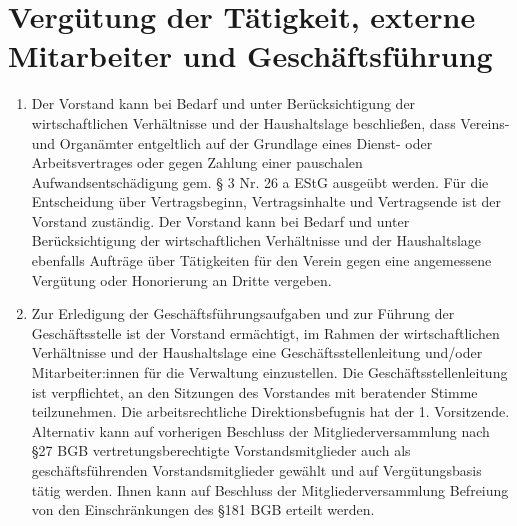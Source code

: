 \documentclass[12pt]{article}
\begin{document}
\section{Vergütung der Tätigkeit, externe Mitarbeiter und Geschäftsführung}
\begin{enumerate}[label=(\arabic*)]
	\item Der Vorstand kann bei Bedarf und unter Berücksichtigung der wirtschaftlichen Verhältnisse und
	      der Haushaltslage beschließen, dass Vereins- und Organämter entgeltlich auf der Grundlage eines
	      Dienst- oder Arbeitsvertrages oder gegen Zahlung einer pauschalen Aufwandsentschädigung gem. §
	      3 Nr. 26 a EStG ausgeübt werden. Für die Entscheidung über Vertragsbeginn, Vertragsinhalte und
	      Vertragsende ist der Vorstand zuständig.
	      Der Vorstand kann bei Bedarf und unter Berücksichtigung der wirtschaftlichen Verhältnisse und der
	      Haushaltslage ebenfalls Aufträge über Tätigkeiten für den Verein gegen eine angemessene
	      Vergütung oder Honorierung an Dritte vergeben.
	\item Zur Erledigung der Geschäftsführungsaufgaben und zur Führung der Geschäftsstelle ist der
	      Vorstand ermächtigt, im Rahmen der wirtschaftlichen Verhältnisse und der Haushaltslage eine
	      Geschäftsstellenleitung und/oder Mitarbeiter:innen für die Verwaltung einzustellen. Die
	      Geschäftsstellenleitung ist verpflichtet, an den Sitzungen des Vorstandes mit beratender Stimme
	      teilzunehmen. Die arbeitsrechtliche Direktionsbefugnis hat der 1. Vorsitzende.
	      Alternativ kann auf vorherigen Beschluss der Mitgliederversammlung nach §27 BGB
	      vertretungsberechtigte Vorstandsmitglieder auch als geschäftsführenden Vorstandsmitglieder
	      gewählt und auf Vergütungsbasis tätig werden. Ihnen kann auf Beschluss der Mitgliederversammlung
	      Befreiung von den Einschränkungen des §181 BGB erteilt werden.
\end{enumerate}
\end{document}
